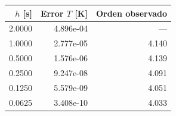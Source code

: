 \begin{tabular}{rrr}
\toprule
$h$ [s] & Error $T$ [K] & Orden observado \\
\midrule
2.0000 & 4.896e-04 & --- \\
1.0000 & 2.777e-05 & 4.140 \\
0.5000 & 1.576e-06 & 4.139 \\
0.2500 & 9.247e-08 & 4.091 \\
0.1250 & 5.579e-09 & 4.051 \\
0.0625 & 3.408e-10 & 4.033 \\
\bottomrule
\end{tabular}
